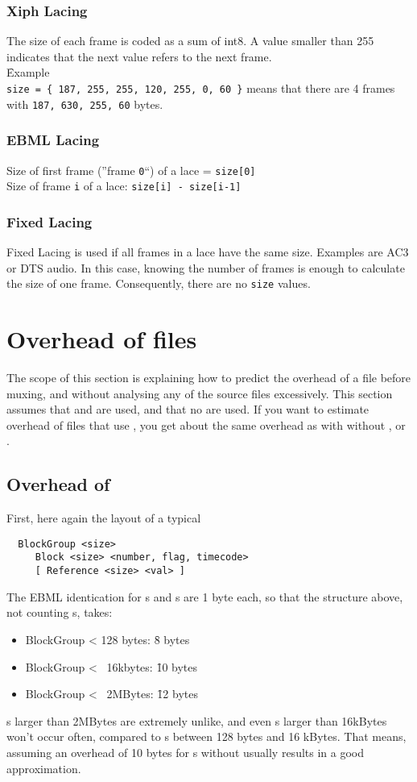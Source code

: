\documentclass[12pt]{article}
\begin{document}
\subsubsection{Xiph Lacing}
\label{xiphlacing}
The size of each frame is coded as a sum of int8. A value smaller than 255
indicates that the next value refers to the next frame.\\[0.2cm]
\f{Example}\\
\texttt{size = \{ 187, 255, 255, 120, 255, 0, 60 \}} means that there are 4 frames with \texttt{187, 630, 255, 60} bytes.
\subsubsection{EBML Lacing}
Size of first frame (''frame \texttt{0}``) of a lace = \texttt{size[0]}\\
Size of frame \texttt{i} of a lace: \texttt{size[i] - size[i-1]}
\subsubsection{Fixed Lacing}
\label{fixedlacing}
Fixed Lacing is used if all frames in a lace have the same size. Examples are
AC3 or DTS audio. In this case, knowing the number of frames is enough to
calculate the size of one frame. Consequently, there are no \texttt{size} values.
\newpage
\section{Overhead of \Matroska files}
The scope of this section is explaining how to predict the overhead of a \Matroska
file before muxing, and without analysing any of the source files excessively. This
section assumes that  and  are used, and that no 
are used. If you want to estimate overhead of files that use , you get about
the same overhead as with  without ,  or .
\subsection{Overhead of }
First, here again the layout of a typical 
\begin{verbatim}
  BlockGroup <size>
     Block <size> <number, flag, timecode>
     [ Reference <size> <val> ]
\end{verbatim}
The EBML identication for s and s are 1 byte each,
so that the structure above, not counting s, takes:
\begin{itemize} \item BlockGroup < 128 bytes: \f{8 bytes}
\item BlockGroup < ~16kbytes: \f{10 bytes}
\item BlockGroup < ~2MBytes: \f{12 bytes}
\end{itemize}
s larger than 2MBytes are extremely unlike, and even s
larger than 16kBytes won't occur often, compared to s between 128 bytes
and 16 kBytes. That means, assuming an overhead of 10 bytes for s without
 usually results in a good approximation.
\end{document}
